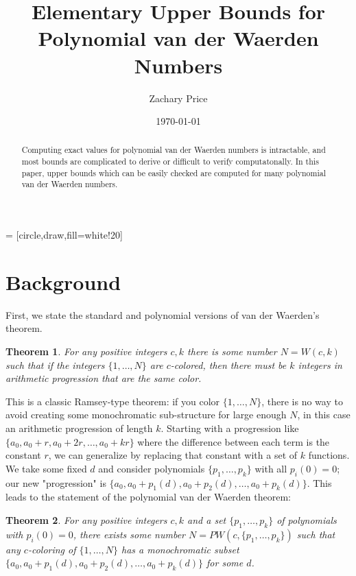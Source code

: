 \documentclass[a4paper]{amsproc}
\title{Elementary Upper Bounds for Polynomial van der Waerden Numbers}
\author[Price]{Zachary Price}
\date{\today}
\theoremstyle{plain}
\newtheorem{thm}{Theorem}[section]
\begin{document}
 = [circle,draw,fill=white!20]

\vspace{18mm} \setcounter{page}{1} \thispagestyle{empty}

\begin{abstract}
  Computing exact values for polynomial van der Waerden numbers is intractable,
  and most bounds are complicated to derive or difficult to verify computatonally.
  In this paper, upper bounds which can be easily checked are computed for many polynomial van der Waerden numbers.
\end{abstract}

\maketitle

\section{Background}

First, we state the standard and polynomial versions of van der Waerden's theorem.

\begin{thm}
  For any positive integers $c,k$ there is some number $N=W(c,k)$ such that if the integers $\{1,\ldots,N\}$ are $c$-colored, then there must be $k$ integers in arithmetic progression that are the same color.
\end{thm}

This is a classic Ramsey-type theorem: if you color $\{1,\ldots,N\}$, there is no way to avoid creating some monochromatic sub-structure for large enough $N$, in this case an arithmetic progression of length $k$.
Starting with a progression like $\{a_0, a_0+r, a_0+2r,\ldots, a_0+kr\}$ where the difference between each term is the constant $r$, we can generalize by replacing that constant with a set of $k$ functions.
We take some fixed $d$ and consider polynomials $\{p_1,\ldots,p_k\}$ with all $p_i(0)=0$; our new "progression" is $\{a_0, a_0+p_1(d), a_0+p_2(d),\ldots, a_0+p_k(d)\}$.
This leads to the statement of the polynomial van der Waerden theorem:

\begin{thm}
  For any positive integers $c,k$ and a set $\{p_1,\ldots,p_k\}$ of polynomials with $p_i(0)=0$, there exists some number $N=PW(c,\{p_1,\ldots,p_k\})$ such that any $c$-coloring of $\{1,\ldots,N\}$ has a monochromatic subset \\${\{a_0, a_0+p_1(d), a_0+p_2(d),\ldots, a_0+p_k(d)\}}$ for some $d$.
\end{thm}
\end{document}
